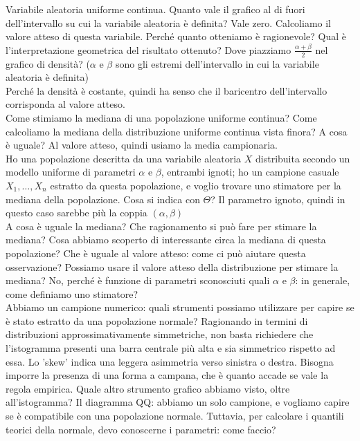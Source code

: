 \documentclass{article}
\begin{document}
    Variabile aleatoria uniforme continua. Quanto vale il grafico al di fuori dell'intervallo su cui la variabile aleatoria è definita? Vale zero. Calcoliamo il valore atteso
    di questa variabile. Perché quanto otteniamo è ragionevole? Qual è l'interpretazione geometrica del risultato ottenuto? Dove piazziamo $ \frac{ \alpha + \beta }{ 2 } $ nel
    grafico di densità? ($ \alpha $ e $ \beta $ sono gli estremi dell'intervallo in cui la variabile aleatoria è definita) \\
    Perché la densità è costante, quindi ha senso che il baricentro dell'intervallo corrisponda al valore atteso. \\
    Come stimiamo la mediana di una popolazione uniforme continua? Come calcoliamo la mediana della distribuzione uniforme continua vista finora? A cosa è uguale? Al valore 
    atteso, quindi usiamo la media campionaria. \\
    Ho una popolazione descritta da una variabile aleatoria $ X $ distribuita secondo un modello uniforme di parametri $ \alpha $ e $ \beta $, entrambi ignoti; ho un campione
    casuale $ X_1, \dots, X_n $ estratto da questa popolazione, e voglio trovare uno stimatore per la mediana della popolazione. Cosa si indica con $ \Theta $? Il parametro
    ignoto, quindi in questo caso sarebbe più la coppia $ ( \alpha, \beta ) $ \\
    A cosa è uguale la mediana? Che ragionamento si può fare per stimare la mediana? Cosa abbiamo scoperto di interessante circa la mediana di questa popolazione? Che è uguale
    al valore atteso: come ci può aiutare questa osservazione? Possiamo usare il valore atteso della distribuzione per stimare la mediana? No, perché è funzione di parametri
    sconosciuti quali $ \alpha $ e $ \beta $: in generale, come definiamo uno stimatore? \\
    Abbiamo un campione numerico: quali strumenti possiamo utilizzare per capire se è stato estratto da una popolazione normale? Ragionando in termini di distribuzioni
    approssimativamente simmetriche, non basta richiedere che l'istogramma presenti una barra centrale più alta e sia simmetrico rispetto ad essa. Lo 'skew' indica una leggera
    asimmetria verso sinistra o destra. Bisogna imporre la presenza di una forma a campana, che è quanto accade se vale la regola empirica. Quale altro strumento grafico
    abbiamo visto, oltre all'istogramma? Il diagramma QQ: abbiamo un solo campione, e vogliamo capire se è compatibile con una popolazione normale. Tuttavia, per calcolare i
    quantili teorici della normale, devo conoscerne i parametri: come faccio?
    
\end{document}
